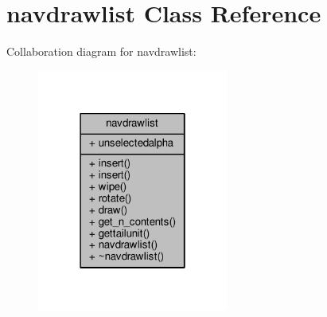 \hypertarget{classnavdrawlist}{}\section{navdrawlist Class Reference}
\label{classnavdrawlist}


Collaboration diagram for navdrawlist\+:
\nopagebreak
\begin{figure}[H]
\begin{center}
\leavevmode
\includegraphics[width=178pt]{d2/d3f/classnavdrawlist__coll__graph}
\end{center}
\end{figure}
